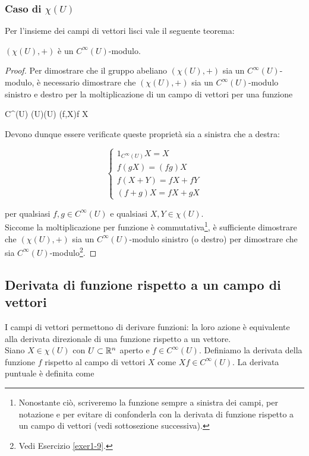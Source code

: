 \subsubsection{Caso di $ \chi(U) $}

Per l'insieme dei campi di vettori lisci vale il seguente teorema:

\begin{theorem}\label{thm:chi-mod}
	$ (\chi(U),+) $ è un $ C^{\infty}(U) $-modulo.
\end{theorem}

\begin{proof}
	Per dimostrare che il gruppo abeliano $ (\chi(U),+) $ sia un $ C^{\infty}(U) $-modulo, è necessario dimostrare che $ (\chi(U),+) $ sia un $ C^{\infty}(U) $-modulo sinistro e destro per la moltiplicazione di un campo di vettori per una funzione
	
	\map{\cdot}
		{C^{\infty}(U) \times \chi(U)}{\chi(U)}
		{(f,X)}{f X}

	Devono dunque essere verificate queste proprietà sia a sinistra che a destra:

	\begin{equation}
		\begin{cases}
			1_{C^{\infty}(U)} X = X \\
			f (g X) = (f g) X \\
			f (X+Y) = f X + f Y \\
			(f+g) X = f X + g X
		\end{cases}
	\end{equation}

	per qualsiasi $ f,g \in C^{\infty}(U) $ e qualsiasi $ X,Y \in \chi(U) $. \\
	Siccome la moltiplicazione per funzione è commutativa\footnote{%
		Nonostante ciò, scriveremo la funzione sempre a sinistra dei campi, per notazione e per evitare di confonderla con la derivata di funzione rispetto a un campo di vettori (vedi sottosezione successiva).%
	}, è sufficiente dimostrare che $ (\chi(U),+) $ sia un $ C^{\infty}(U) $-modulo sinistro (o destro) per dimostrare che sia $ C^{\infty}(U) $-modulo\footnote{%
		Vedi Esercizio \ref{exer1-9}.%
	}.
\end{proof}

\subsection{Derivata di funzione rispetto a un campo di vettori}

I campi di vettori permettono di derivare funzioni: la loro azione è equivalente alla derivata direzionale di una funzione rispetto a un vettore. \\
Siano $ X \in \chi(U) $ con $ U \subset \mathbb{R}^{n} $ aperto e $ f \in C^{\infty}(U) $. Definiamo la derivata della funzione $ f $ rispetto al campo di vettori $ X $ come $ X f \in C^{\infty}(U) $. La derivata puntuale è definita come

